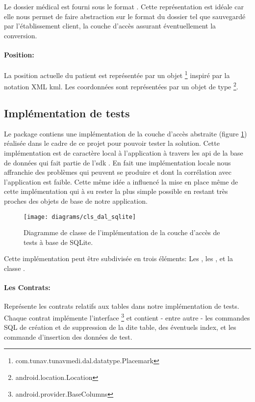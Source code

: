 Le dossier médical est fourni sous le format . Cette représentation est idéale car elle nous permet de faire abstraction sur le format du dossier tel que sauvegardé par l'établissement client, la couche d’accès assurant éventuellement la conversion.


\paragraph{Position:}

La position actuelle du patient est représentée par un objet \footnote{com.tunav.tunavmedi.dal.datatype.Placemark} inspiré par la notation XML \gls{kml}. Les coordonnées sont représentées par un objet de type \footnote{android.location.Location}.

\subsection{Implémentation de tests}\label{subsection:dal_impl}

Le package  contiens une
implémentation de la couche d’accès abstraite (figure
\ref{fig:dal_sqlite}) réalisée dans le cadre de ce projet pour
pouvoir tester la solution. Cette implémentation est de caractère local
à l'application à travers les \gls{api} de la base de données
 qui fait partie de l'\gls{sdk} \android{}. En fait une
implémentation locale nous affranchie des problèmes qui peuvent se
produire et dont la corrélation avec l'application est faible. Cette même
idée a influencé la mise en place même de cette implémentation qui à su
rester la plus simple possible en restant très proches des objets de
base de notre application.

\begin{figure}
\center
\texttt{[image: diagrams/cls\_dal\_sqlite]}
\caption{Diagramme de classe de l'implémentation de la couche d'accès de tests  à base de SQLite.}
\label{fig:dal_sqlite}
\end{figure}

Cette implémentation peut être subdivisée en trois éléments: Les , les , et la classe .

\paragraph{Les Contrats:}

Représente les contrats relatifs aux tables dans notre implémentation de
tests. Chaque contrat implémente l'interface
\footnote{android.provider.BaseColumns} et contient - entre autre - les
commandes SQL de création et de suppression de la dite table, des
éventuels index, et les commande d'insertion des données de test.

